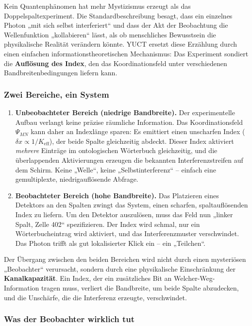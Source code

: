 \documentclass[12pt,a4paper]{article}
\theoremstyle{remark}
\begin{document}
	Kein Quantenphänomen hat mehr Mystizismus erzeugt als das Doppelspaltexperiment. Die Standardbeschreibung besagt, dass ein einzelnes Photon „mit sich selbst interferiert“ und dass der Akt der Beobachtung die Wellenfunktion „kollabieren“ lässt, als ob menschliches Bewusstsein die physikalische Realität verändern könnte. YUCT ersetzt diese Erzählung durch einen einfachen informationstheoretischen Mechanismus: Das Experiment sondiert die \textbf{Auflösung des Index}, den das Koordinationsfeld unter verschiedenen Bandbreitenbedingungen liefern kann.
	
	\subsubsection{Zwei Bereiche, ein System}
	
	\begin{enumerate}[leftmargin=*]
		\item \textbf{Unbeobachteter Bereich (niedrige Bandbreite).}
		Der experimentelle Aufbau verlangt keine präzise räumliche Information. Das Koordinationsfeld $\Psi_{MN}$ kann daher an Indexlänge sparen: Es emittiert einen unscharfen Index ($\delta x \propto 1/K_{\mathrm{eff}}$), der beide Spalte gleichzeitig abdeckt. Dieser Index aktiviert \emph{mehrere} Einträge im ontologischen Wörterbuch gleichzeitig, und die überlappenden Aktivierungen erzeugen die bekannten Interferenzstreifen auf dem Schirm. Keine „Welle“, keine „Selbstinterferenz“ – einfach eine gemultiplexte, niedrigauflösende Abfrage.
		
		\item \textbf{Beobachteter Bereich (hohe Bandbreite).}
		Das Platzieren eines Detektors an den Spalten zwingt das System, einen scharfen, spaltauflösenden Index zu liefern. Um den Detektor auszulösen, muss das Feld nun „linker Spalt, Zelle 402“ spezifizieren. Der Index wird schmal, nur ein Wörterbucheintrag wird aktiviert, und das Interferenzmuster verschwindet. Das Photon trifft als gut lokalisierter Klick ein – ein „Teilchen“.
	\end{enumerate}
	
	Der Übergang zwischen den beiden Bereichen wird nicht durch einen mysteriösen „Beobachter“ verursacht, sondern durch eine physikalische Einschränkung der \textbf{Kanalkapazität}. Ein Index, der ein zusätzliches Bit an Welcher-Weg-Information tragen muss, verliert die Bandbreite, um beide Spalte abzudecken, und die Unschärfe, die die Interferenz erzeugte, verschwindet.
	
	\subsubsection{Was der Beobachter wirklich tut}
	
\end{document}
